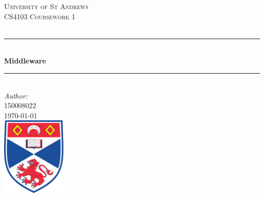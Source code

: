 \documentclass[12pt]{article}
\begin{document}
\begin{titlepage}

\newcommand{\HRule}{\rule{\linewidth}{0.5mm}} %

\center %
 

\textsc{\LARGE University of St Andrews}\\[1.5cm] %
\textsc{\Large CS4103 Coursework 1}\\[0.5cm] %
\textsc{\large }\\[0.5cm] %


\HRule \\[0.4cm]
{ \huge \bfseries Middleware}\\[0.4cm] %
\HRule \\[1.5cm]
 


\Large \emph{Author:}\\
 \textsc{150008022}\\[3cm] %


{\large \today}\\[2cm] %


\includegraphics[width = 3.1cm]{images/standrewslogo.png}
 

\vfill %

\end{titlepage}
\end{document}
